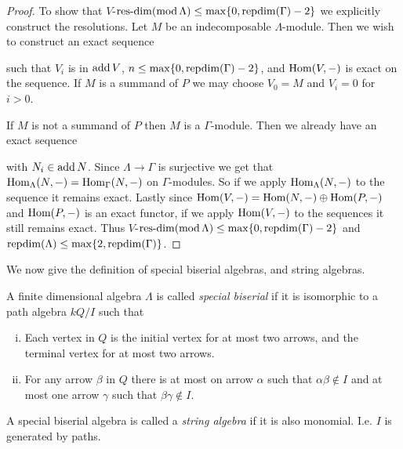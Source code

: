 \begin{theorem}
\begin{proof}
		To show that $V$-$\operatorname{res-dim}(\operatorname{mod} \Lambda) \leq \max\{0, \operatorname{repdim}(\Gamma)-2\}$ we explicitly construct the resolutions. Let $M$ be an indecomposable $\Lambda$-module. Then we wish to construct an exact sequence
		\begin{center}
		\end{center} 
		such that $V_i$ is in $\operatorname{add} V$, $n\leq \max\{0, \operatorname{repdim}(\Gamma)-2\}$, and $\operatorname{Hom}(V, -)$ is exact on the sequence. If $M$ is a summand of $P$ we may choose $V_0=M$ and $V_i=0$ for $i>0$.
		
		If $M$ is not a summand of $P$ then $M$ is a $\Gamma$-module. Then we already have an exact sequence
		\begin{center}
		\end{center} 
		with $N_i \in \operatorname{add} N$. Since $\Lambda \to \Gamma$ is surjective we get that $\operatorname{Hom}_\Lambda(N, -)=\operatorname{Hom}_\Gamma(N,-)$ on $\Gamma$-modules. So if we apply $\operatorname{Hom}_\Lambda(N, -)$ to the sequence it remains exact. Lastly since $\operatorname{Hom}(V,-) = \operatorname{Hom}(N, -) \oplus \operatorname{Hom}(P, -)$ and $\operatorname{Hom}(P, -)$ is an exact functor, if we apply $\operatorname{Hom}(V, -)$ to the sequences it still remains exact. Thus $V$-$\operatorname{res-dim}(\operatorname{mod} \Lambda) \leq \max\{0, \operatorname{repdim}(\Gamma)-2\}$ and $\operatorname{repdim}(\Lambda) \leq \max\{2, \operatorname{repdim}(\Gamma)\}$. 
	\end{proof}
\end{theorem}

We now give the definition of special biserial algebras, and string algebras.

\begin{defn}
	A finite dimensional algebra $\Lambda$ is called \emph{special biserial} if it is isomorphic to a path algebra $kQ/I$ such that
	\begin{enumerate}[i)]
		\item Each vertex in $Q$ is the initial vertex for at most two arrows, and the terminal vertex for at most two arrows.
		\item For any arrow $\beta$ in $Q$ there is at most on arrow $\alpha$ such that $\alpha\beta \not\in I$ and at most one arrow $\gamma$ such that $\beta\gamma \not\in I$.
	\end{enumerate}
	A special biserial algebra is called a \emph{string algebra} if it is also monomial. I.e. $I$ is generated by paths. 
\end{defn}

